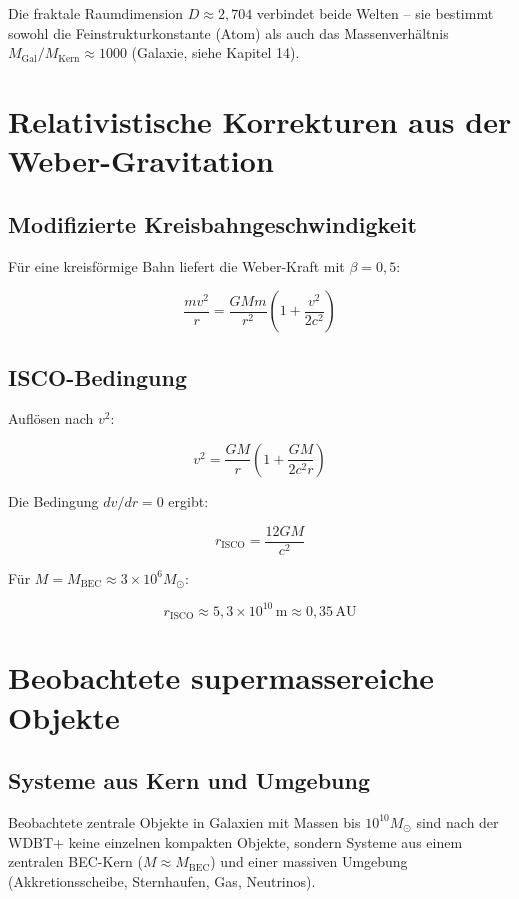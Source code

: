 Die fraktale Raumdimension \( D \approx 2,704 \) verbindet beide Welten – 
sie bestimmt sowohl die Feinstrukturkonstante (Atom) als auch das 
Massenverhältnis \( M_{\text{Gal}} / M_{\text{Kern}} \approx 1000 \) 
(Galaxie, siehe Kapitel 14).

\section{Relativistische Korrekturen aus der Weber-Gravitation}

\subsection{Modifizierte Kreisbahngeschwindigkeit}

Für eine kreisförmige Bahn liefert die Weber-Kraft mit \( \beta = 0,5 \):

\[
\frac{mv^2}{r} = \frac{GMm}{r^2} \left( 1 + \frac{v^2}{2c^2} \right) \tag{L.19}
\]

\subsection{ISCO-Bedingung}

Auflösen nach \( v^2 \):

\[
v^2 = \frac{GM}{r} \left( 1 + \frac{GM}{2c^2 r} \right) \tag{L.20}
\]

Die Bedingung \( dv/dr = 0 \) ergibt:

\[
r_{\text{ISCO}} = \frac{12GM}{c^2} \tag{L.21}
\]

Für \( M = M_{\text{BEC}} \approx 3 \times 10^6 M_{\odot} \):

\[
r_{\text{ISCO}} \approx 5,3 \times 10^{10} \, \text{m} \approx 0,35 \, \text{AU}
\]

\section{Beobachtete supermassereiche Objekte}

\subsection{Systeme aus Kern und Umgebung}

Beobachtete zentrale Objekte in Galaxien mit Massen bis \( 10^{10} M_{\odot} \) 
sind nach der WDBT+ keine einzelnen kompakten Objekte, sondern Systeme 
aus einem zentralen BEC-Kern (\( M \approx M_{\text{BEC}} \)) und einer 
massiven Umgebung (Akkretionsscheibe, Sternhaufen, Gas, Neutrinos).

